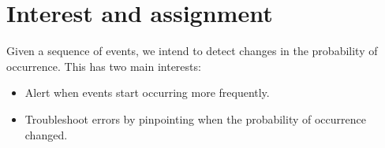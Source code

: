 \documentclass{kththesis}
\begin{document}
%
%
%

\section{Interest and assignment}

Given a sequence of events, we intend to detect changes in the probability of occurrence. This has two main interests:

\begin{itemize}
\item Alert when events start occurring more frequently.
\item Troubleshoot errors by pinpointing when the probability of occurrence changed.
\end{itemize}
\end{document}
